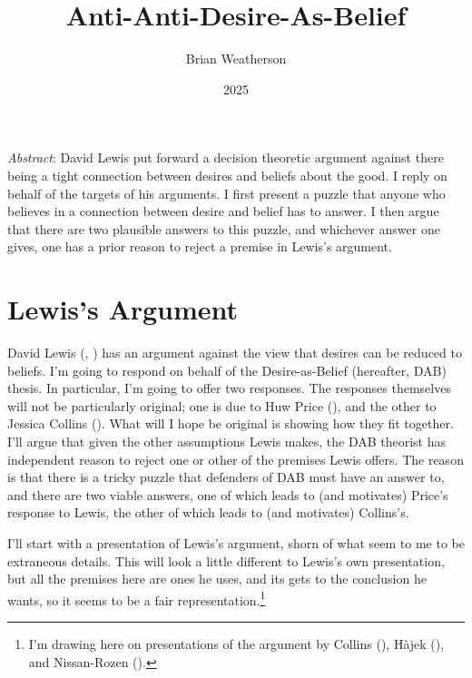 \documentclass[
  11pt,
  letterpaper,
  DIV=11,
  numbers=noendperiod,
  twoside]{scrartcl}
\title{Anti-Anti-Desire-As-Belief}
\author{Brian Weatherson}
\date{2025}
\renewenvironment{abstract}
 {\vspace{-1.25cm}
 \quotation\small\noindent\emph{Abstract}:}
 {\endquotation}
\renewenvironment{abstract}
 {\quotation\small\noindent\emph{Abstract}:}
 {\endquotation\vspace{-0.02cm}}
\begin{document}
\maketitle
\begin{abstract}
David Lewis put forward a decision theoretic argument against there
being a tight connection between desires and beliefs about the good. I
reply on behalf of the targets of his arguments. I first present a
puzzle that anyone who believes in a connection between desire and
belief has to answer. I then argue that there are two plausible answers
to this puzzle, and whichever answer one gives, one has a prior reason
to reject a premise in Lewis's argument.
\end{abstract}


\section{Lewis's Argument}\label{sec-lewis}

David Lewis (,
) has an argument against the view that
desires can be reduced to beliefs. I'm going to respond on behalf of the
Desire-as-Belief (hereafter, DAB) thesis. In particular, I'm going to
offer two responses. The responses themselves will not be particularly
original; one is due to Huw Price (), and
the other to Jessica Collins (). What
will I hope be original is showing how they fit together. I'll argue
that given the other assumptions Lewis makes, the DAB theorist has
independent reason to reject one or other of the premises Lewis offers.
The reason is that there is a tricky puzzle that defenders of DAB must
have an answer to, and there are two viable answers, one of which leads
to (and motivates) Price's response to Lewis, the other of which leads
to (and motivates) Collins's.

I'll start with a presentation of Lewis's argument, shorn of what seem
to me to be extraneous details. This will look a little different to
Lewis's own presentation, but all the premises here are ones he uses,
and its gets to the conclusion he wants, so it seems to be a fair
representation.\footnote{I'm drawing here on presentations of the
  argument by Collins (), Hàjek
  (), and Nissan-Rozen
  ().}
\end{document}
